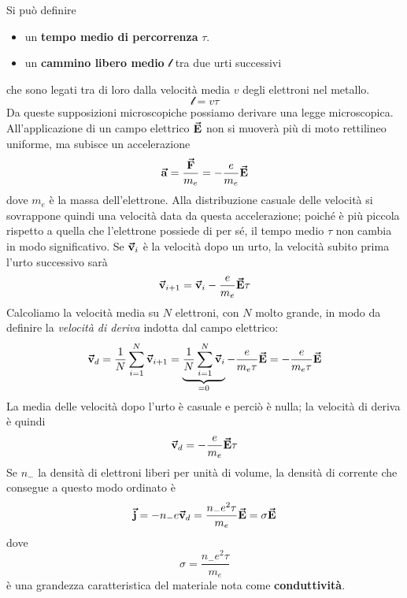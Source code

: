 Si può definire
\begin{itemize}
	\item un \textbf{tempo medio di percorrenza} $\tau$.
	\item un \textbf{cammino libero medio} $\mathcal{l}$ tra due urti successivi
\end{itemize}
che sono legati tra di loro dalla velocità media $v$ degli elettroni nel metallo.
\begin{equation}
	\mathcal{l}=v\tau
\end{equation}
Da queste supposizioni microscopiche possiamo derivare una legge microscopica. All'applicazione di un campo elettrico $\vb*{\va{E}}$ non si muoverà più di moto rettilineo uniforme, ma subisce un accelerazione
\begin{equation*}
	\vb*{\va{a}}=\frac{\vb*{\va{F}}}{m_{e}}=-\frac{e}{m_{e}}\vb*{\va{E}}
\end{equation*}
dove $m_e$ è la massa dell'elettrone. Alla distribuzione casuale delle velocità si sovrappone quindi una velocità data da questa accelerazione; poiché è più piccola rispetto a quella che l'elettrone possiede di per sé, il tempo medio $\tau$ non cambia in modo significativo. Se $\vb*{\va{v}}_i$ è la velocità dopo un urto, la velocità subito prima l'urto successivo sarà
\begin{equation*}
	\vb*{\va{v}}_{i+1}=\vb*{\va{v}}_i-\frac{e}{m_{e}}\vb*{\va{E}}\tau
\end{equation*}
Calcoliamo la velocità media su $N$ elettroni, con $N$ molto grande, in modo da definire la \textit{velocità di deriva} indotta dal campo elettrico:
\begin{equation*}
	\vb*{\va{v}}_d=\frac{1}{N}\sum_{i=1}^{N}\vb*{\va{v}}_{i+1}=\underbrace{\frac{1}{N}\sum_{i=1}^{N}\vb*{\va{v}}_i}_{=0}-\frac{e}{m_{e}\tau}\vb*{\va{E}}=-\frac{e}{m_{e}\tau}\vb*{\va{E}}
\end{equation*}
La media delle velocità dopo l'urto è casuale e perciò è nulla; la velocità di deriva è quindi
\begin{equation}
	\vb*{\va{v}}_d=-\frac{e}{m_{e}}\vb*{\va{E}}\tau
\end{equation}
Se $n_{-}$ la densità di elettroni liberi per unità di volume, la densità di corrente che consegue a questo modo ordinato è
\begin{equation}
	\vb*{\va{j}}=-n_{-}e\vb*{\va{v}}_d=\frac{n_{-}e^2\tau}{m_{e}}\vb*{\va{E}}=\sigma\vb*{\va{E}}
\end{equation}
dove
\begin{equation*}
	\sigma=\frac{n_{-}e^2\tau}{m_{e}}
\end{equation*}
è una grandezza caratteristica del materiale nota come \textbf{conduttività}.
